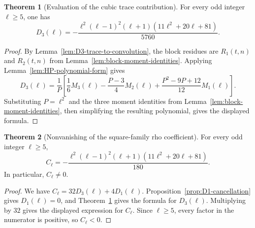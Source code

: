 \documentclass{article}
\theoremstyle{definition}
\newtheorem{theorem}{Theorem}[section]
\numberwithin{equation}{section}
\begin{document}
\begin{theorem}[Evaluation of the cubic trace contribution]
\label{thm:D3-closed-form}
For every odd integer $\ell\geq 5$, one has
\begin{equation}
D_3(\ell)=-\frac{\ell^2(\ell-1)^2(\ell+1)(11\ell^2+20\ell+81)}{5760}.
\end{equation}
\end{theorem}

\begin{proof}
By Lemma~\ref{lem:D3-trace-to-convolution}, the block residues are $R_1(t,n)$ and $R_2(t,n)$ from Lemma~\ref{lem:block-moment-identities}.  Applying Lemma~\ref{lem:HP-polynomial-form} gives
\begin{equation}
D_3(\ell)=\frac1P\left[\frac16M_3(\ell)-\frac{P-3}{4}M_2(\ell)+\frac{P^2-9P+12}{12}M_1(\ell)\right].
\end{equation}
Substituting $P=\ell^2$ and the three moment identities from Lemma~\ref{lem:block-moment-identities}, then simplifying the resulting polynomial, gives the displayed formula.
\end{proof}

\begin{theorem}[Nonvanishing of the square-family rho coefficient]
\label{thm:Cell-nonvanishing-square-family}
For every odd integer $\ell\geq 5$,
\begin{equation}
C_\ell=-\frac{\ell^2(\ell-1)^2(\ell+1)(11\ell^2+20\ell+81)}{180}.
\end{equation}
In particular, $C_\ell\neq 0$.
\end{theorem}

\begin{proof}
We have $C_\ell=32D_3(\ell)+4D_1(\ell)$.  Proposition~\ref{prop:D1-cancellation} gives $D_1(\ell)=0$, and Theorem~\ref{thm:D3-closed-form} gives the formula for $D_3(\ell)$.  Multiplying by $32$ gives the displayed expression for $C_\ell$.  Since $\ell\geq 5$, every factor in the numerator is positive, so $C_\ell<0$.
\end{proof}
\end{document}

